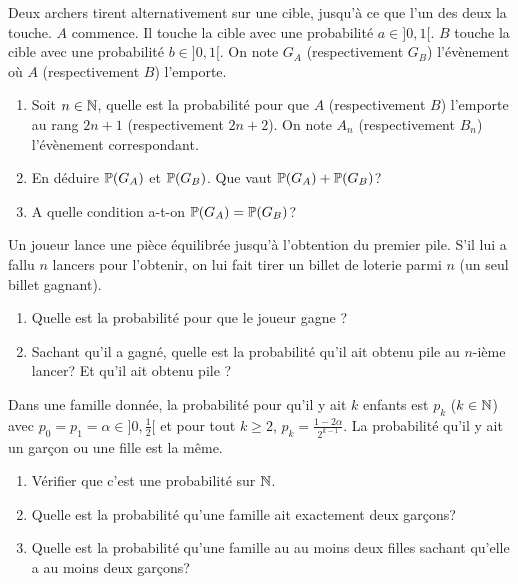 \documentclass[12pt]{article}
\begin{document}
\begin{exercise}
	Deux archers tirent alternativement sur une cible, jusqu'à ce que l'un des
	deux la touche. $A$ commence. Il touche la cible avec une probabilité
	$a\in]0,1[$. $B$ touche la cible avec une probabilité $b\in]0,1[$. On note
	$G_{A}$ (respectivement $G_{B}$) l'évènement où $A$ (respectivement $B$)
	l'emporte.
	\begin{enumerate}
		\item
		Soit $n\in\N$, quelle est la probabilité pour que $A$ (respectivement $B$)
		l'emporte au rang $2n+1$ (respectivement $2n+2$). On note $A_{n}$
		(respectivement $B_{n}$) l'évènement correspondant.
		\item
		En déduire $\P(G_{A})$ et $\P(G_{B})$. Que vaut $\P(G_{A})+\P(G_{B})$?
		\item A quelle condition a-t-on $\P(G_{A})=\P(G_{B})$?
	\end{enumerate}
\end{exercise}

\begin{exercise}
	Un joueur lance une pièce équilibrée jusqu'à l'obtention du premier pile. S'il
	lui a fallu $n$ lancers pour l'obtenir, on lui fait tirer un billet de loterie
	parmi $n$ (un seul billet gagnant).
	\begin{enumerate}
		\item
		Quelle est la probabilité pour que le joueur gagne ?
		\item
		Sachant qu'il a gagné, quelle est la probabilité qu'il ait obtenu pile au
		$n$-ième lancer? Et qu'il ait obtenu pile ?
	\end{enumerate}
\end{exercise}

\begin{exercise}
	Dans une famille donnée, la probabilité pour qu'il y ait $k$ enfants est
	$p_{k}$ ($k\in\N$) avec $p_{0}=p_{1}=\alpha\in]0,\frac{1}{2}[$ et pour tout
	$k\geqslant2$, $p_{k}=\frac{1-2\alpha}{2^{k-1}}$. La probabilité qu'il y ait
	un garçon ou une fille est la même.
	\begin{enumerate}
		\item
		Vérifier que c'est une probabilité sur $\N$.
		\item
		Quelle est la probabilité qu'une famille ait exactement deux garçons?
		\item
		Quelle est la probabilité qu'une famille au au moins deux filles sachant
		qu'elle a au moins deux garçons?
	\end{enumerate}
\end{exercise}
\end{document}
